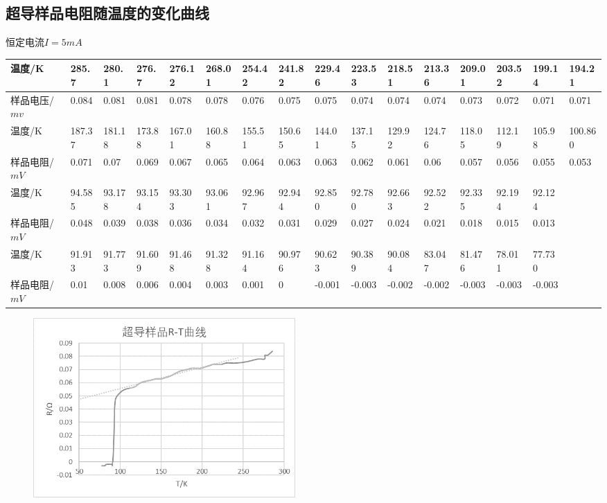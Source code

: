\documentclass[UTF8]{ctexart}
\begin{document}
\subsection{超导样品电阻随温度的变化曲线}
恒定电流$I=5mA$
\begin{table}[H]
\tiny
\begin{tabular}{|l|l|l|l|l|l|l|l|l|l|l|l|l|l|l|l|}
\hline
温度/K          & 285.7  & 280.1  & 276.7  & 276.12 & 268.01 & 254.42 & 241.82 & 229.46 & 223.53 & 218.51 & 213.36 & 209.01 & 203.52 & 199.14 & 194.21  \\ \hline
样品电压/$mv$ & 0.084  & 0.081  & 0.081  & 0.078  & 0.078  & 0.076  & 0.075  & 0.075  & 0.074  & 0.074  & 0.074  & 0.073  & 0.072  & 0.071  & 0.071   \\ \hline
温度/K          & 187.37 & 181.18 & 173.88 & 167.01 & 160.88 & 155.51 & 150.65 & 144.01 & 137.15 & 129.92 & 124.76 & 118.05 & 112.19 & 105.98 & 100.860 \\ \hline
样品电阻/$mV$ & 0.071  & 0.07   & 0.069  & 0.067  & 0.065  & 0.064  & 0.063  & 0.063  & 0.062  & 0.061  & 0.06   & 0.057  & 0.056  & 0.055  & 0.053   \\ \hline
温度/K          & 94.585 & 93.178 & 93.154 & 93.303 & 93.061 & 92.967 & 92.944 & 92.850 & 92.780 & 92.663 & 92.522 & 92.335 & 92.194 & 92.124 &         \\ \hline
样品电阻/$mV$ & 0.048  & 0.039  & 0.038  & 0.036  & 0.034  & 0.032  & 0.031  & 0.029  & 0.027  & 0.024  & 0.021  & 0.018  & 0.015  & 0.013  &         \\ \hline
温度/K          & 91.913 & 91.773 & 91.609 & 91.468 & 91.328 & 91.164 & 90.976 & 90.623 & 90.389 & 90.084 & 83.047 & 81.476 & 78.011 & 77.730 &         \\ \hline
样品电阻/$mV$ & 0.01   & 0.008  & 0.006  & 0.004  & 0.003  & 0.001  & 0      & -0.001 & -0.003 & -0.002 & -0.002 & -0.003 & -0.003 & -0.003 &         \\ \hline
\end{tabular}
\end{table}

\begin{figure}[H]
\centering
\includegraphics[width=10cm]{pic1.png}
\end{figure}
\end{document}
